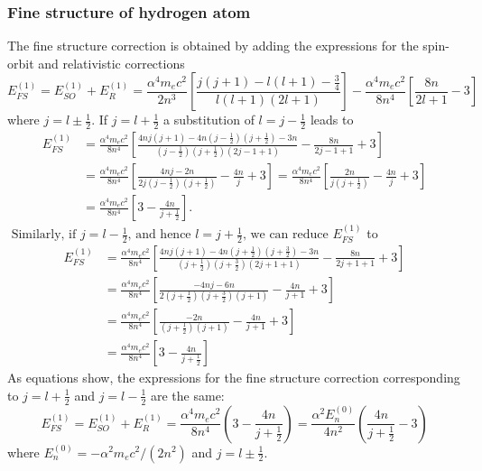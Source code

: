 \subsubsection{Fine structure of hydrogen atom}
The fine structure correction is obtained by adding the expressions for the spin-orbit and relativistic corrections
$$
E_{F S}^{(1)}=E_{S O}^{(1)}+E_{R}^{(1)}=\frac{\alpha^{4} m_{e} c^{2}}{2 n^{3}}\left[\frac{j(j+1)-l(l+1)-\frac{3}{4}}{l(l+1)(2 l+1)}\right]-\frac{\alpha^{4} m_{e} c^{2}}{8 n^{4}}\left[\frac{8 n}{2 l+1}-3\right]
$$
where $j=l \pm \frac{1}{2} .$ If $j=l+\frac{1}{2}$ a substitution of $l=j-\frac{1}{2}$  leads to
$$\begin{aligned}
	E_{F S}^{(1)} &=\frac{\alpha^{4} m_{e} c^{2}}{8 n^{4}}\left[\frac{4 n j(j+1)-4 n\left(j-\frac{1}{2}\right)\left(j+\frac{1}{2}\right)-3 n}{\left(j-\frac{1}{2}\right)\left(j+\frac{1}{2}\right)(2 j-1+1)}-\frac{8 n}{2 j-1+1}+3\right] \\
	&=\frac{\alpha^{4} m_{e} c^{2}}{8 n^{4}}\left[\frac{4 n j-2 n}{2 j\left(j-\frac{1}{2}\right)\left(j+\frac{1}{2}\right)}-\frac{4 n}{j}+3\right]=\frac{\alpha^{4} m_{e} c^{2}}{8 n^{4}}\left[\frac{2 n}{j\left(j+\frac{1}{2}\right)}-\frac{4 n}{j}+3\right] \\
	&=\frac{\alpha^{4} m_{e} c^{2}}{8 n^{4}}\left[3-\frac{4 n}{j+\frac{1}{2}}\right] .
\end{aligned}$$
$\text { Similarly, if } j=l-\frac{1}{2} \text {, and hence } l=j+\frac{1}{2} \text {, we can reduce } E_{F S}^{(1)}$ to\\
$$\begin{aligned}
	E_{F S}^{(1)} &=\frac{\alpha^{4} m_{e} c^{2}}{8 n^{4}}\left[\frac{4 n j(j+1)-4 n\left(j+\frac{1}{2}\right)\left(j+\frac{3}{2}\right)-3 n}{\left(j+\frac{1}{2}\right)\left(j+\frac{3}{2}\right)(2 j+1+1)}-\frac{8 n}{2 j+1+1}+3\right] \\
	&=\frac{\alpha^{4} m_{e} c^{2}}{8 n^{4}}\left[\frac{-4 n j-6 n}{2\left(j+\frac{1}{2}\right)\left(j+\frac{3}{2}\right)(j+1)}-\frac{4 n}{j+1}+3\right] \\
	&=\frac{\alpha^{4} m_{e} c^{2}}{8 n^{4}}\left[\frac{-2 n}{\left(j+\frac{1}{2}\right)(j+1)}-\frac{4 n}{j+1}+3\right] \\
	&=\frac{\alpha^{4} m_{e} c^{2}}{8 n^{4}}\left[3-\frac{4 n}{j+\frac{1}{2}}\right]
\end{aligned}$$
As equations show, the expressions for the fine structure correction corresponding to $j=l+\frac{1}{2}$ and $j=l-\frac{1}{2}$ are the same:
$$
E_{F S}^{(1)}=E_{S O}^{(1)}+E_{R}^{(1)}=\frac{\alpha^{4} m_{e} c^{2}}{8 n^{4}}\left(3-\frac{4 n}{j+\frac{1}{2}}\right)=\frac{\alpha^{2} E_{n}^{(0)}}{4 n^{2}}\left(\frac{4 n}{j+\frac{1}{2}}-3\right)
$$
where $E_{n}^{(0)}=-\alpha^{2} m_{e} c^{2} /\left(2 n^{2}\right)$ and $j=l \pm \frac{1}{2}$.

